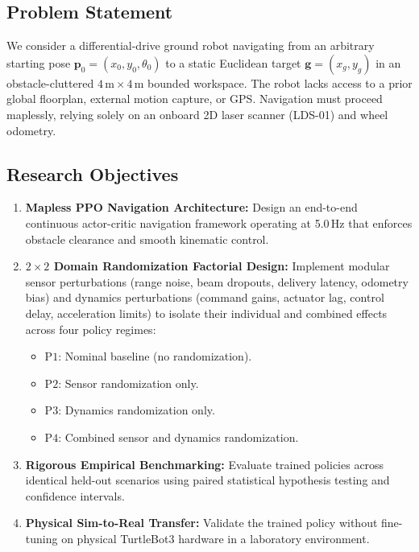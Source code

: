 \documentclass[conference]{IEEEtran}
\begin{document}
\subsection{Problem Statement}
We consider a differential-drive ground robot navigating from an arbitrary starting pose $\mathbf{p}_0 = (x_0, y_0, \theta_0)$ to a static Euclidean target $\mathbf{g} = (x_g, y_g)$ in an obstacle-cluttered $4\,\text{m} \times 4\,\text{m}$ bounded workspace. The robot lacks access to a prior global floorplan, external motion capture, or GPS. Navigation must proceed maplessly, relying solely on an onboard 2D laser scanner (LDS-01) and wheel odometry.

\subsection{Research Objectives}
\begin{enumerate}
    \item \textbf{Mapless PPO Navigation Architecture:} Design an end-to-end continuous actor-critic navigation framework operating at 5.0\,Hz that enforces obstacle clearance and smooth kinematic control.
    \item \textbf{$2 \times 2$ Domain Randomization Factorial Design:} Implement modular sensor perturbations (range noise, beam dropouts, delivery latency, odometry bias) and dynamics perturbations (command gains, actuator lag, control delay, acceleration limits) to isolate their individual and combined effects across four policy regimes:
    \begin{itemize}
        \item $\text{P1}$: Nominal baseline (no randomization).
        \item $\text{P2}$: Sensor randomization only.
        \item $\text{P3}$: Dynamics randomization only.
        \item $\text{P4}$: Combined sensor and dynamics randomization.
    \end{itemize}
    \item \textbf{Rigorous Empirical Benchmarking:} Evaluate trained policies across identical held-out scenarios using paired statistical hypothesis testing and confidence intervals.
    \item \textbf{Physical Sim-to-Real Transfer:} Validate the trained policy without fine-tuning on physical TurtleBot3 hardware in a laboratory environment.
\end{enumerate}
\end{document}
